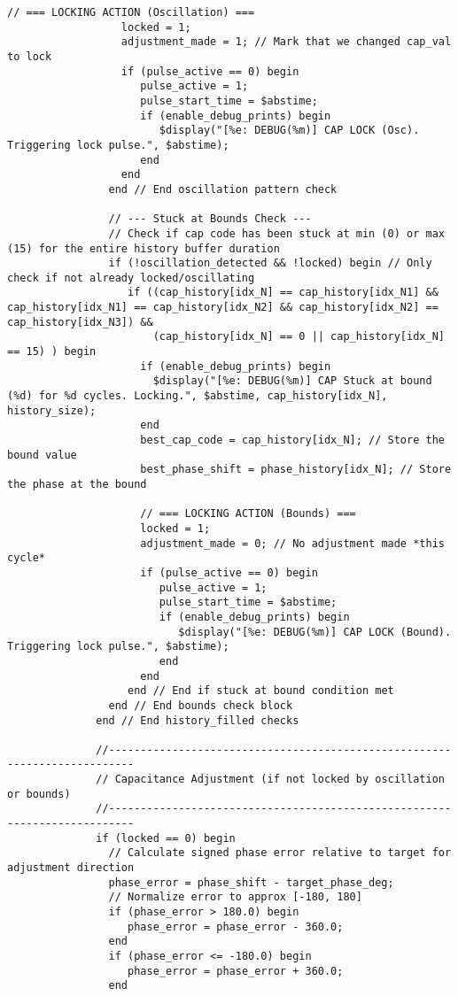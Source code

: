 \begin{lstlisting}[caption={Verilog-A Generic Capacitor Tuner Implementation}]
                  // === LOCKING ACTION (Oscillation) ===
                  locked = 1;
                  adjustment_made = 1; // Mark that we changed cap_val to lock
                  if (pulse_active == 0) begin
                     pulse_active = 1;
                     pulse_start_time = $abstime;
                     if (enable_debug_prints) begin
                        $display("[%e: DEBUG(%m)] CAP LOCK (Osc). Triggering lock pulse.", $abstime);
                     end
                  end
                end // End oscillation pattern check

                // --- Stuck at Bounds Check ---
                // Check if cap code has been stuck at min (0) or max (15) for the entire history buffer duration
                if (!oscillation_detected && !locked) begin // Only check if not already locked/oscillating
                   if ((cap_history[idx_N] == cap_history[idx_N1] && cap_history[idx_N1] == cap_history[idx_N2] && cap_history[idx_N2] == cap_history[idx_N3]) &&
                       (cap_history[idx_N] == 0 || cap_history[idx_N] == 15) ) begin
                     if (enable_debug_prints) begin
                       $display("[%e: DEBUG(%m)] CAP Stuck at bound (%d) for %d cycles. Locking.", $abstime, cap_history[idx_N], history_size);
                     end
                     best_cap_code = cap_history[idx_N]; // Store the bound value
                     best_phase_shift = phase_history[idx_N]; // Store the phase at the bound

                     // === LOCKING ACTION (Bounds) ===
                     locked = 1;
                     adjustment_made = 0; // No adjustment made *this cycle*
                     if (pulse_active == 0) begin
                        pulse_active = 1;
                        pulse_start_time = $abstime;
                        if (enable_debug_prints) begin
                           $display("[%e: DEBUG(%m)] CAP LOCK (Bound). Triggering lock pulse.", $abstime);
                        end
                     end
                   end // End if stuck at bound condition met
                end // End bounds check block
              end // End history_filled checks

              //--------------------------------------------------------------------------
              // Capacitance Adjustment (if not locked by oscillation or bounds)
              //--------------------------------------------------------------------------
              if (locked == 0) begin
                // Calculate signed phase error relative to target for adjustment direction
                phase_error = phase_shift - target_phase_deg;
                // Normalize error to approx [-180, 180]
                if (phase_error > 180.0) begin
                   phase_error = phase_error - 360.0;
                end
                if (phase_error <= -180.0) begin
                   phase_error = phase_error + 360.0;
                end


\end{lstlisting}
